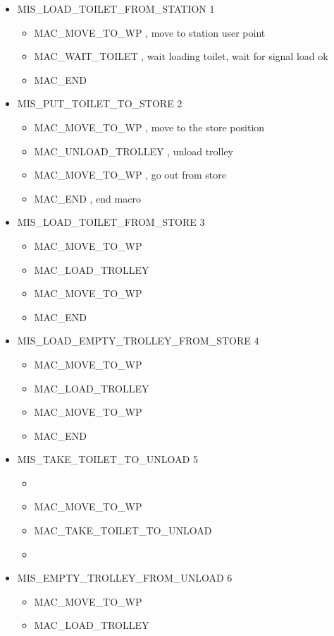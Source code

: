 \begin{itemize}
\item MIS\_LOAD\_TOILET\_FROM\_STATION	1
	\begin{itemize}
		\item MAC\_MOVE\_TO\_WP , move to station user point
		\item MAC\_WAIT\_TOILET , wait loading toilet, wait for signal load ok
		\item MAC\_END
	\end{itemize}
\item MIS\_PUT\_TOILET\_TO\_STORE		2
	\begin{itemize}
		\item MAC\_MOVE\_TO\_WP , move to the store position
		\item MAC\_UNLOAD\_TROLLEY , unload trolley
		\item MAC\_MOVE\_TO\_WP , go out from store
		\item MAC\_END , end macro
	\end{itemize}
\item MIS\_LOAD\_TOILET\_FROM\_STORE	3
	\begin{itemize}
		\item MAC\_MOVE\_TO\_WP 
		\item MAC\_LOAD\_TROLLEY
		\item MAC\_MOVE\_TO\_WP 
		\item MAC\_END
	\end{itemize}
\item MIS\_LOAD\_EMPTY\_TROLLEY\_FROM\_STORE 4
	\begin{itemize}
		\item MAC\_MOVE\_TO\_WP 
		\item MAC\_LOAD\_TROLLEY
		\item MAC\_MOVE\_TO\_WP 
		\item MAC\_END
	\end{itemize}
\item MIS\_TAKE\_TOILET\_TO\_UNLOAD 5
	\begin{itemize}
		\item 
		\item MAC\_MOVE\_TO\_WP 
		\item MAC\_TAKE\_TOILET\_TO\_UNLOAD
		\item
	\end{itemize}
\item MIS\_EMPTY\_TROLLEY\_FROM\_UNLOAD 6
	\begin{itemize}
		\item MAC\_MOVE\_TO\_WP
		\item MAC\_LOAD\_TROLLEY

\end{itemize}
\end{itemize}
